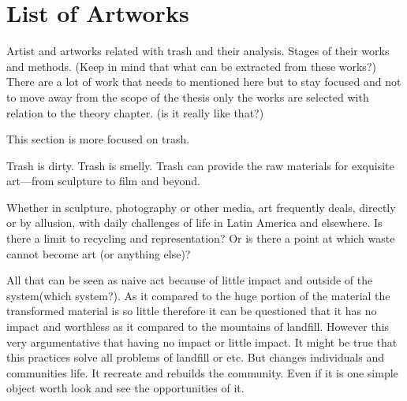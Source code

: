 \section{List of Artworks}
Artist and artworks related with trash and their analysis. Stages of their works and methods. (Keep in mind that what can be extracted from these works?) There are a lot of work that needs to mentioned here but to stay focused and not to move away from the scope of the thesis only the works are selected with relation to the theory chapter. (is it really like that?) 

This section is more focused on trash.

Trash is dirty. Trash is smelly. Trash can provide the raw materials for exquisite art---from sculpture to film and beyond.

Whether in sculpture, photography or other media, art frequently deals, directly or by allusion, with daily challenges of life in Latin America and elsewhere. Is there a limit to recycling and representation? Or is there a point at which waste cannot become art (or anything else)?

All that can be seen as naive act because of little impact and outside of the system(which system?). As it compared to the huge portion of the material the transformed material is so little therefore it can be questioned that it has no impact and worthless as it compared to the mountains of landfill. However this very argumentative that having no impact or little impact. It might be true that this practices solve all problems of landfill or etc. But changes individuals and communities life. It recreate and rebuilds the community. Even if it is one simple object worth look and see the opportunities of it. 

